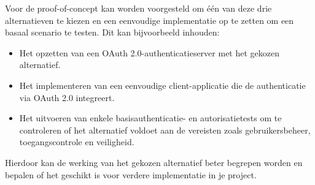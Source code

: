 Voor de proof-of-concept kan worden voorgesteld om één van deze drie alternatieven te kiezen en een eenvoudige implementatie op te zetten om een basaal scenario te testen. Dit kan bijvoorbeeld inhouden:

\begin{itemize}
    \item Het opzetten van een OAuth 2.0-authenticatieserver met het gekozen alternatief.
    \item Het implementeren van een eenvoudige client-applicatie die de authenticatie via OAuth 2.0 integreert.
    \item Het uitvoeren van enkele basisauthenticatie- en autorisatietests om te controleren of het alternatief voldoet aan de vereisten zoals gebruikersbeheer, toegangscontrole en veiligheid.
\end{itemize}

Hierdoor kan de werking van het gekozen alternatief beter begrepen worden en bepalen of het geschikt is voor verdere implementatie in je project.
